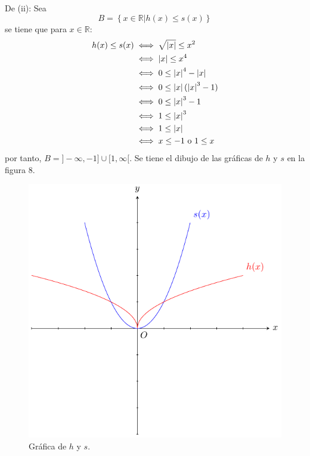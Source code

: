 \documentclass[12pt]{article}
\begin{document}
\begin{enumerate}
\begin{sol}
        De (ii): Sea
        \begin{equation*}
            B=\left\{x\in\mathbb{R}\Big| h(x)\leq s(x) \right\}
        \end{equation*}
        se tiene que para $x\in\mathbb{R}$:
        \begin{equation*}
            \begin{split}
                h(x)\leq s(x)&\iff\sqrt{\left| x \right|}\leq x^2\\
                &\iff \left| x \right|\leq x^4\\
                &\iff 0\leq \left| x \right|^4-\left| x \right|\\
                &\iff 0\leq \left| x \right|(\left| x \right|^3-1)\\
                &\iff 0\leq \left| x \right|^3-1\\
                &\iff 1\leq \left| x \right|^3\\
                &\iff 1\leq \left| x \right|\\
                &\iff x\leq-1\textup{ o }1\leq x \\
            \end{split}
        \end{equation*}
        por tanto, $B=]-\infty, -1]\cup[1,\infty[$. Se tiene el dibujo de las gráficas de $h$ y $s$ en la figura 8.
        \begin{figure}
            \begin{center}
                \includegraphics[scale=1]{images/3_11_2.pdf}
            \end{center}
            \caption{Gráfica de $h$ y $s$.}
        \end{figure}


\end{sol}
\end{enumerate}
\end{document}
